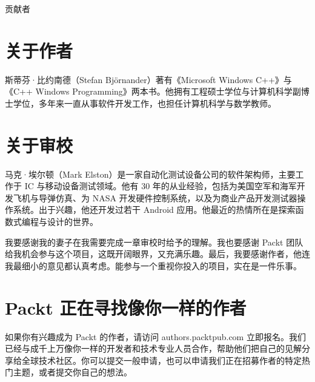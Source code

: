 \thispagestyle{empty}
\vspace*{-24.1bp}
\begin{flushright}
{\sffamily\fontsize{30bp}{34bp}\selectfont 贡献者\par}
\end{flushright}
\vspace{26bp}
\markboth{}{}

\section{关于作者}



斯蒂芬·比约南德（Stefan Björnander）著有《Microsoft Windows C++》与《C++ Windows Programming》两本书。他拥有工程硕士学位与计算机科学副博士学位，多年来一直从事软件开发工作，也担任计算机科学与数学教师。

\section{关于审校}

马克·埃尔顿（Mark Elston）是一家自动化测试设备公司的软件架构师，主要工作于 IC 与移动设备测试领域。他有 30 年的从业经验，包括为美国空军和海军开发飞机与导弹仿真、为 NASA 开发硬件控制系统，以及为商业产品开发测试器操作系统。出于兴趣，他还开发过若干 Android 应用。他最近的热情所在是探索函数式编程与设计的世界。

我要感谢我的妻子在我需要完成一章审校时给予的理解。我也要感谢 Packt 团队给我机会参与这个项目，这既开阔眼界，又充满乐趣。最后，我要感谢作者，他连我最细小的意见都认真考虑。能参与一个重视你投入的项目，实在是一件乐事。

\section{Packt 正在寻找像你一样的作者}

如果你有兴趣成为 Packt 的作者，请访问 authors.packtpub.com 立即报名。我们已经与成千上万像你一样的开发者和技术专业人员合作，帮助他们把自己的见解分享给全球技术社区。你可以提交一般申请，也可以申请我们正在招募作者的特定热门主题，或者提交你自己的想法。
